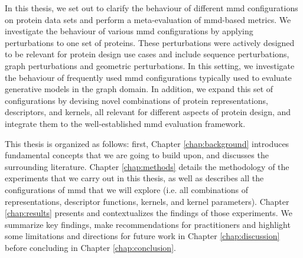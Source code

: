 In this thesis, we set out to clarify the behaviour of different \gls{mmd}
configurations on protein data sets and perform a meta-evaluation of
\gls{mmd}-based metrics. We investigate the behaviour of various
\gls{mmd} configurations by applying perturbations to one set of proteins.
These perturbations were actively designed to be relevant for protein design use
cases and include sequence perturbations, graph perturbations and geometric
perturbations. In this setting, we investigate the behaviour of frequently used
\gls{mmd} configurations typically used to evaluate generative models in
the graph domain. In addition, we expand this set of configurations by devising
novel combinations of protein representations, descriptors, and kernels, all
relevant for different aspects of protein design, and integrate them to the
well-established \gls{mmd} evaluation framework.

This thesis is organized as follows: first, Chapter \ref{chap:background}
introduces fundamental concepts that we are going to build upon, and discusses
the surrounding literature. Chapter \ref{chap:methods} details the methodology
of the experiments that we carry out in this thesis, as well as
describes all the configurations of \gls{mmd} that we will explore (i.e. all
combinations of representations, descriptor functions, kernels, and kernel
parameters). Chapter \ref{chap:results} presents and contextualizes the findings of those
experiments. We summarize key findings, make recommendations for practitioners and
highlight some limitations and directions for future work in Chapter
\ref{chap:discussion} before concluding in Chapter \ref{chap:conclusion}.





